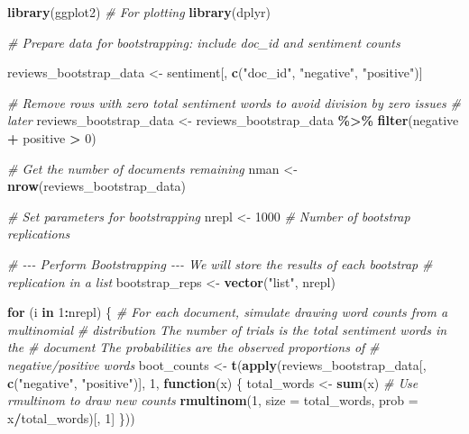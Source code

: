 \documentclass[
]{book}
\newenvironment{Shaded}{\begin{snugshade}}{\end{snugshade}}
\newcommand{\AttributeTok}[1]{\textcolor[rgb]{0.13,0.29,0.53}{#1}}
\newcommand{\CommentTok}[1]{\textcolor[rgb]{0.56,0.35,0.01}{\textit{#1}}}
\newcommand{\ControlFlowTok}[1]{\textcolor[rgb]{0.13,0.29,0.53}{\textbf{#1}}}
\newcommand{\DecValTok}[1]{\textcolor[rgb]{0.00,0.00,0.81}{#1}}
\newcommand{\FunctionTok}[1]{\textcolor[rgb]{0.13,0.29,0.53}{\textbf{#1}}}
\newcommand{\NormalTok}[1]{#1}
\newcommand{\OtherTok}[1]{\textcolor[rgb]{0.56,0.35,0.01}{#1}}
\newcommand{\SpecialCharTok}[1]{\textcolor[rgb]{0.81,0.36,0.00}{\textbf{#1}}}
\newcommand{\StringTok}[1]{\textcolor[rgb]{0.31,0.60,0.02}{#1}}
\begin{document}
\begin{Shaded}
\begin{Highlighting}[]
\FunctionTok{library}\NormalTok{(ggplot2)  }\CommentTok{\# For plotting}
\FunctionTok{library}\NormalTok{(dplyr)}

\CommentTok{\# Prepare data for bootstrapping: include doc\_id and sentiment counts}

\NormalTok{reviews\_bootstrap\_data }\OtherTok{\textless{}{-}}\NormalTok{ sentiment[, }\FunctionTok{c}\NormalTok{(}\StringTok{"doc\_id"}\NormalTok{, }\StringTok{"negative"}\NormalTok{, }\StringTok{"positive"}\NormalTok{)]}

\CommentTok{\# Remove rows with zero total sentiment words to avoid division by zero issues}
\CommentTok{\# later}
\NormalTok{reviews\_bootstrap\_data }\OtherTok{\textless{}{-}}\NormalTok{ reviews\_bootstrap\_data }\SpecialCharTok{\%\textgreater{}\%}
    \FunctionTok{filter}\NormalTok{(negative }\SpecialCharTok{+}\NormalTok{ positive }\SpecialCharTok{\textgreater{}} \DecValTok{0}\NormalTok{)}

\CommentTok{\# Get the number of documents remaining}
\NormalTok{nman }\OtherTok{\textless{}{-}} \FunctionTok{nrow}\NormalTok{(reviews\_bootstrap\_data)}

\CommentTok{\# Set parameters for bootstrapping}
\NormalTok{nrepl }\OtherTok{\textless{}{-}} \DecValTok{1000}  \CommentTok{\# Number of bootstrap replications}

\CommentTok{\# {-}{-}{-} Perform Bootstrapping {-}{-}{-} We will store the results of each bootstrap}
\CommentTok{\# replication in a list}
\NormalTok{bootstrap\_reps }\OtherTok{\textless{}{-}} \FunctionTok{vector}\NormalTok{(}\StringTok{"list"}\NormalTok{, nrepl)}

\ControlFlowTok{for}\NormalTok{ (i }\ControlFlowTok{in} \DecValTok{1}\SpecialCharTok{:}\NormalTok{nrepl) \{}
    \CommentTok{\# For each document, simulate drawing word counts from a multinomial}
    \CommentTok{\# distribution The number of trials is the total sentiment words in the}
    \CommentTok{\# document The probabilities are the observed proportions of}
    \CommentTok{\# negative/positive words}
\NormalTok{    boot\_counts }\OtherTok{\textless{}{-}} \FunctionTok{t}\NormalTok{(}\FunctionTok{apply}\NormalTok{(reviews\_bootstrap\_data[, }\FunctionTok{c}\NormalTok{(}\StringTok{"negative"}\NormalTok{, }\StringTok{"positive"}\NormalTok{)], }\DecValTok{1}\NormalTok{,}
        \ControlFlowTok{function}\NormalTok{(x) \{}
\NormalTok{            total\_words }\OtherTok{\textless{}{-}} \FunctionTok{sum}\NormalTok{(x)}
            \CommentTok{\# Use rmultinom to draw new counts}
            \FunctionTok{rmultinom}\NormalTok{(}\DecValTok{1}\NormalTok{, }\AttributeTok{size =}\NormalTok{ total\_words, }\AttributeTok{prob =}\NormalTok{ x}\SpecialCharTok{/}\NormalTok{total\_words)[, }\DecValTok{1}\NormalTok{]}
\NormalTok{        \}))}


\end{Highlighting}
\end{Shaded}
\end{document}
